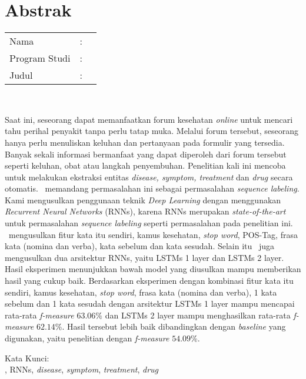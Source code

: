 %
%
%

\chapter*{Abstrak}

\vspace*{0.2cm}

\noindent \begin{tabular}{l l p{10cm}}
	Nama&: & \penulis \\
	Program Studi&: & \program \\
	Judul&: & \judul \\
\end{tabular} \\ 

\vspace*{0.5cm}

\noindent
Saat ini, seseorang dapat memanfaatkan forum kesehatan \textit{online} untuk mencari tahu perihal penyakit tanpa perlu tatap muka.  Melalui forum tersebut, seseorang hanya perlu menuliskan keluhan dan pertanyaan pada formulir yang tersedia. Banyak sekali informasi bermanfaat yang dapat diperoleh dari forum tersebut seperti keluhan, obat atau langkah penyembuhan. Penelitian kali ini mencoba untuk melakukan ekstraksi entitas \textit{disease, symptom, treatment} dan \textit{drug} secara otomatis. \Saya~memandang permasalahan ini sebagai permasalahan \textit{sequence labeling}. Kami mengusulkan penggunaan teknik \textit{Deep Learning} dengan menggunakan \textit{Recurrent Neural Networks} (RNNs), karena RNNs merupakan \textit{state-of-the-art} untuk permasalahan \textit{sequence labeling} seperti permasalahan pada penelitian ini. \Saya~mengusulkan fitur kata itu sendiri, kamus kesehatan, \textit{stop word}, POS-Tag, frasa kata (nomina dan verba), kata sebelum dan kata sesudah. Selain itu \saya~juga mengusulkan dua arsitektur RNNs, yaitu LSTMs 1 layer dan LSTMs 2 layer. Hasil eksperimen menunjukkan bawah model yang diusulkan mampu memberikan hasil yang cukup baik. Berdasarkan eksperimen dengan kombinasi fitur kata itu sendiri, kamus kesehatan, \textit{stop word}, frasa kata (nomina dan verba), 1 kata sebelum dan 1 kata sesudah dengan arsitektur LSTMs 1 layer mampu mencapai rata-rata \textit{f-measure} $ 63.06\% $ dan LSTMs 2 layer mampu menghasilkan rata-rata \textit{f-measure} $ 62.14\% $. Hasil tersebut lebih baik dibandingkan dengan \textit{baseline} yang digunakan, yaitu penelitian \cite{skripsiKakRadit} dengan \textit{f-measure} $ 54.09\% $.


\vspace*{0.2cm}

\noindent Kata Kunci: \\ 
\noindent \mer, RNNs, \textit{disease}, \textit{symptom}, \textit{treatment}, \textit{drug} \\ 

\newpage